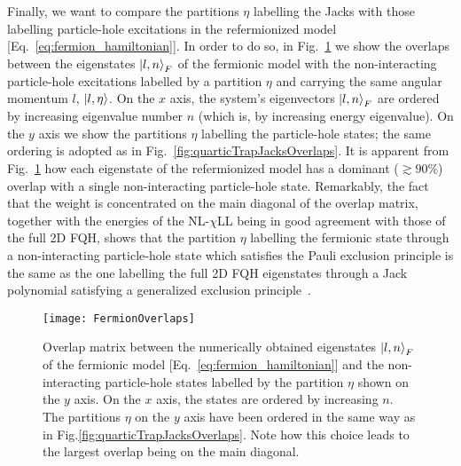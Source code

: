 \documentclass[twocolumn,pra,superscriptaddress,noshowpacs]{revtex4}
\newcommand{\nlchill}{NL-$\chi$LL }
\begin{document}
Finally, we want to compare the partitions $\eta$ labelling the Jacks with those labelling particle-hole excitations in the refermionized model [Eq.~\eqref{eq:fermion_hamiltonian}]. In order to do so,
in Fig.~\ref{fig:FermionOverlaps} we show %
the overlaps between the eigenstates $\ket{l,n}_F$ of the fermionic model with the non-interacting particle-hole excitations labelled by a partition $\eta$ and carrying the same angular momentum $l$, $\ket{l,\eta}$.
On the $x$ axis, the system's eigenvectors $\ket{l,n}_F$ are ordered by increasing eigenvalue number $n$ (which is, by increasing energy eigenvalue).
On the $y$ axis we show the partitions $\eta$ labelling the particle-hole states; the same ordering is adopted as in Fig.~\ref{fig:quarticTrapJacksOverlaps}.
It is apparent from Fig.~\ref{fig:FermionOverlaps} how each eigenstate of the refermionized model has a dominant ($\gtrsim90\%$) overlap with a single non-interacting particle-hole state.
Remarkably, the fact that the weight is concentrated on the main diagonal of the overlap matrix, together with the energies of the \nlchill being in good agreement with those of the full 2D FQH,
shows that the partition $\eta$ labelling the fermionic state through a non-interacting particle-hole state which satisfies the Pauli exclusion principle
is the same as the one labelling the full 2D FQH eigenstates through a Jack polynomial satisfying a generalized exclusion principle~\cite{BernevigHaldane_PRL_2008}.



\begin{figure}[htbp]
   	\begin{adjustbox}{width=.5\textwidth, totalheight=\baselineskip,keepaspectratio,right}
      	\texttt{[image: FermionOverlaps]}
    \end{adjustbox}
    \vspace{0.0cm}\caption{Overlap matrix between the numerically obtained eigenstates $\ket{l,n}_F$ of the fermionic model [Eq.~\eqref{eq:fermion_hamiltonian}] and the non-interacting particle-hole states labelled by the partition $\eta$ shown on the $y$ axis.
    On the $x$ axis, the states are ordered by increasing $n$. The partitions $\eta$ on the $y$ axis have been ordered in the same way as in Fig.\ref{fig:quarticTrapJacksOverlaps}. Note how this choice leads to the largest overlap being on the main diagonal.
    \label{fig:FermionOverlaps}}
\end{figure}
\end{document}
